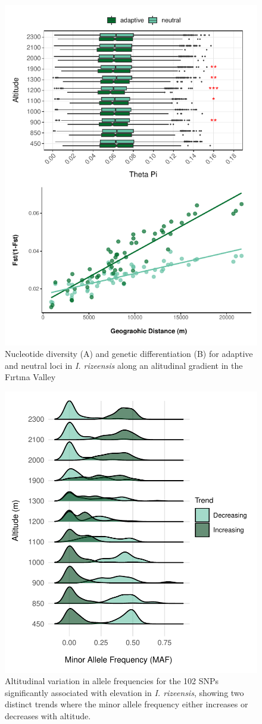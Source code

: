 \documentclass[9pt,a4paper,twoside]{rho-class/rho}
\begin{document}
\clearpage
\newpage
\begin{figure}[h!]
\centering
\includegraphics[width=0.8\columnwidth]{Figure_3.pdf}
\captionsetup[table]{labelsep=space, 
        justification=raggedright, singlelinecheck=off}
    \caption{Nucleotide diversity (A) and genetic differentiation (B) for adaptive and neutral loci in \textit{I. rizeensis} along an alitudinal gradient in the Fırtına Valley}
\label{Figure 3}
\end{figure}
\newpage
\begin{figure}[h!]
\centering
\includegraphics[width=0.8\columnwidth]{Figure_4.pdf}
\caption{Altitudinal variation in allele frequencies for the 102 SNPs significantly associated with elevation in \textit{I. rizeensis}, showing two distinct trends where the minor allele frequency either increases or decreases with altitude.}
\label{Figure 4}
\end{figure}
\end{document}
